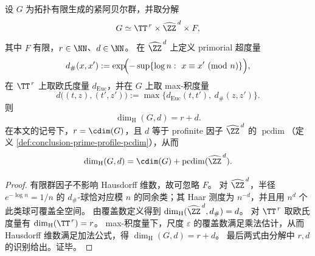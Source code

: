 \begin{theorem}\label{thm:conclusion-adelic-hausdorff-dimension-cdim-pcdim}
设 \(G\) 为拓扑有限生成的紧阿贝尔群，并取分解
\[
G\simeq \TT^{\,r}\times \widehat{\ZZ}^{\,d}\times F,
\]
其中 \(F\) 有限，\(r\in\NN\)、\(d\in\NN\)。
在 \(\widehat{\ZZ}^{\,d}\) 上定义 primorial 超度量
\[
d_{\#}(x,x')
:=
\exp\!\Bigl(-\sup\{\log n:\ x\equiv x'\ (\mathrm{mod}\ n)\}\Bigr),
\]
在 \(\TT^{\,r}\) 上取欧氏度量 \(d_{\mathrm{Euc}}\)，并在 \(G\) 上取 max-积度量
\[
d\bigl((t,z),(t',z')\bigr):=\max\{d_{\mathrm{Euc}}(t,t'),\ d_{\#}(z,z')\}.
\]
则
\[
\dim_{\mathrm H}(G,d)=r+d.
\]
在本文的记号下，\(r=\cdim(G)\)，且 \(d\) 等于 profinite 因子 \(\widehat{\ZZ}^{\,d}\) 的 \(\operatorname{pcdim}\)（定义 \ref{def:conclusion-prime-profile-pcdim}），从而
\[
\dim_{\mathrm H}(G,d)=\cdim(G)+\operatorname{pcdim}(\widehat{\ZZ}^{\,d}).
\]
\end{theorem}

\begin{proof}
有限群因子不影响 Hausdorff 维数，故可忽略 \(F\)。
对 \(\widehat{\ZZ}^{\,d}\)，半径 \(e^{-\log n}=1/n\) 的 \(d_{\#}\)-球恰对应模 \(n\) 的同余类；其 Haar 测度为 \(n^{-d}\)，并且用 \(n^d\) 个此类球可覆盖全空间。
由覆盖数定义得到 \(\dim_{\mathrm H}(\widehat{\ZZ}^{\,d},d_{\#})=d\)。
对 \(\TT^{\,r}\) 取欧氏度量有 \(\dim_{\mathrm H}(\TT^{\,r})=r\)。
max-积度量下，尺度 \(\varepsilon\) 的覆盖数满足乘法估计，从而 Hausdorff 维数满足加法公式，得 \(\dim_{\mathrm H}(G,d)=r+d\)。
最后两式由分解中 \(r,d\) 的识别给出。证毕。
\end{proof}

\endinput


